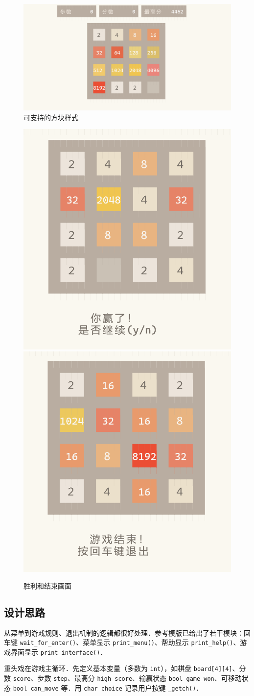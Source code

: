 \documentclass[12pt,a4paper,twoside]{ctexart}
\numberwithin{figure}{section}
\numberwithin{equation}{section}
\begin{document}
\begin{figure}[p]
    \centering
    \includegraphics[width=.6\textwidth]{every.png}
    \caption{可支持的方块样式}
\end{figure}

\begin{figure}[p]
    \centering
    \includegraphics[width=.3\textwidth]{win.png}
    \includegraphics[width=.3\textwidth]{over.png}
    \caption{胜利和结束画面}
\end{figure}




\subsection{设计思路}
从菜单到游戏规则、退出机制的逻辑都很好处理．参考模版已给出了若干模块：回车键 \verb|wait_for_enter()|、菜单显示 \verb|print_menu()|、帮助显示 \verb|print_help()|、游戏界面显示 \verb|print_interface()|．

重头戏在游戏主循环．先定义基本变量（多数为 \verb|int|），如棋盘 \verb|board[4][4]|、分数 \verb|score|、步数 \verb|step|、最高分 \verb|high_score|、输赢状态 \verb|bool game_won|、可移动状态 \verb|bool can_move| 等．用 \verb|char choice| 记录用户按键 \verb|_getch()|．
\end{document}
